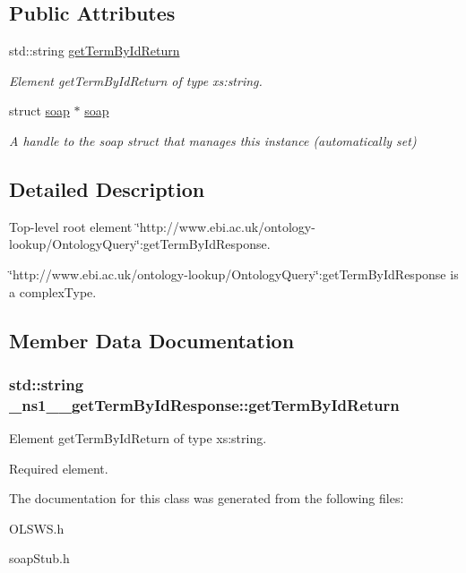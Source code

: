 \subsection*{Public Attributes}
\begin{DoxyCompactItemize}
\item 
std::string \hyperlink{class__ns1____getTermByIdResponse_a80c469b199b0a371d0f2e7830e3ab29d}{getTermByIdReturn}
\begin{DoxyCompactList}\small\item\em Element getTermByIdReturn of type xs:string. \end{DoxyCompactList}\item 
\hypertarget{class__ns1____getTermByIdResponse_aa259a612b0c6d9ded3ad5cc8133b49f3}{
struct \hyperlink{class__ns1____getTermByIdResponse_aa259a612b0c6d9ded3ad5cc8133b49f3}{soap} $\ast$ \hyperlink{class__ns1____getTermByIdResponse_aa259a612b0c6d9ded3ad5cc8133b49f3}{soap}}
\label{class__ns1____getTermByIdResponse_aa259a612b0c6d9ded3ad5cc8133b49f3}

\begin{DoxyCompactList}\small\item\em A handle to the soap struct that manages this instance (automatically set) \end{DoxyCompactList}\end{DoxyCompactItemize}


\subsection{Detailed Description}
Top-\/level root element \char`\"{}http://www.ebi.ac.uk/ontology-\/lookup/OntologyQuery\char`\"{}:getTermByIdResponse. 

\char`\"{}http://www.ebi.ac.uk/ontology-\/lookup/OntologyQuery\char`\"{}:getTermByIdResponse is a complexType. 

\subsection{Member Data Documentation}
\hypertarget{class__ns1____getTermByIdResponse_a80c469b199b0a371d0f2e7830e3ab29d}{
\subsubsection[{getTermByIdReturn}]{\setlength{\rightskip}{0pt plus 5cm}std::string {\bf \_\-ns1\_\-\_\-getTermByIdResponse::getTermByIdReturn}}}
\label{class__ns1____getTermByIdResponse_a80c469b199b0a371d0f2e7830e3ab29d}


Element getTermByIdReturn of type xs:string. 

Required element. 

The documentation for this class was generated from the following files:\begin{DoxyCompactItemize}
\item 
OLSWS.h\item 
soapStub.h\end{DoxyCompactItemize}
